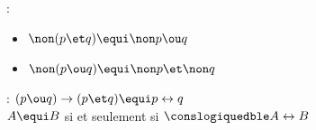  : 
\begin{itemize}
  \item $\non (p \et q) \equi \non p \ou q$
  \item $\non (p \ou q) \equi \non p \et \non q$
\end{itemize}
 : $(p\ou q) \rightarrow (p\et q) \equi p \leftrightarrow q$\\
 $A \equi B$ si et seulement si $\conslogiquedble A \leftrightarrow B$ \\

